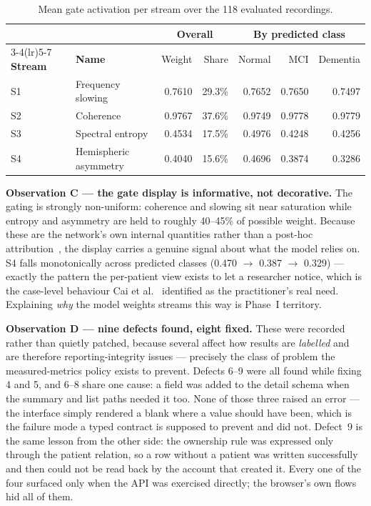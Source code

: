 \documentclass[11pt,a4paper]{article}
\begin{document}
\begin{table}[H]\centering
\caption{Mean gate activation per stream over the 118 evaluated recordings.}
\label{tab:gates}\footnotesize
\begin{tabular}{@{}ll rr rrr@{}}
\toprule
& & \multicolumn{2}{c}{\textbf{Overall}} & \multicolumn{3}{c}{\textbf{By predicted class}} \\
\cmidrule(lr){3-4}\cmidrule(lr){5-7}
\textbf{Stream} & \textbf{Name} & Weight & Share & Normal & MCI & Dementia \\
\midrule
S1 & Frequency slowing & 0.7610 & 29.3\% & 0.7652 & 0.7650 & 0.7497 \\
S2 & Coherence & 0.9767 & 37.6\% & 0.9749 & 0.9778 & 0.9779 \\
S3 & Spectral entropy & 0.4534 & 17.5\% & 0.4976 & 0.4248 & 0.4256 \\
S4 & Hemispheric asymmetry & 0.4040 & 15.6\% & 0.4696 & 0.3874 & 0.3286 \\
\bottomrule
\end{tabular}
\end{table}

\textbf{Observation C --- the gate display is informative, not decorative.} The
gating is strongly non-uniform: coherence and slowing sit near saturation while
entropy and asymmetry are held to roughly 40--45\% of possible weight. Because
these are the network's own internal quantities rather than a post-hoc
attribution~\cite{rudin2019}, the display carries a genuine signal about what the
model relies on. S4 falls monotonically across predicted classes
(0.470 $\to$ 0.387 $\to$ 0.329) --- exactly the pattern the per-patient view
exists to let a researcher notice, which is the case-level behaviour
Cai et al.~\cite{cai2019} identified as the practitioner's real need. Explaining
\emph{why} the model weights streams this way is Phase~I territory.

\textbf{Observation D --- nine defects found, eight fixed.} These were recorded
rather than quietly patched, because several affect how results are
\emph{labelled} and are therefore reporting-integrity issues --- precisely the
class of problem the measured-metrics policy exists to prevent. Defects 6--9
were all found while fixing 4 and 5, and 6--8 share one cause: a field was added
to the detail schema when the summary and list paths needed it too. None of
those three raised an error --- the interface simply rendered a blank where a
value should have been, which is the failure mode a typed contract is supposed
to prevent and did not. Defect~9 is the same lesson from the other side: the
ownership rule was expressed only through the patient relation, so a row without
a patient was written successfully and then could not be read back by the
account that created it. Every one of the four surfaced only when the API was
exercised directly; the browser's own flows hid all of them.
\end{document}
